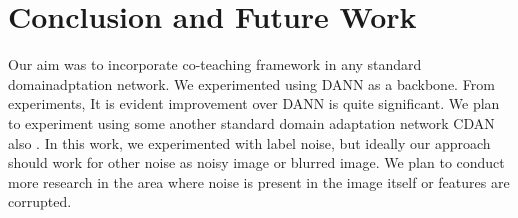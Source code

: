 \section{Conclusion and Future Work}
Our aim was to incorporate co-teaching framework in any standard domainadptation network. We experimented using DANN as a backbone. From experiments, It is evident improvement over DANN is quite significant. We plan to experiment using some another standard domain adaptation network CDAN also \cite{cdan}. In this work, we experimented with label noise, but ideally our approach should work for other noise as noisy image or blurred image. We plan to conduct more research in the area where noise is present in the image itself or features are corrupted.   





